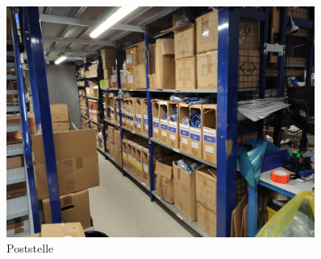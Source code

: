 \begin{figure}[H] 
  \centering
     \includegraphics[width=0.9\textwidth]{poststelle1.jpg}
  \caption{Poststelle}
  \label{fig:Bild1}
\end{figure} 
\noindent

